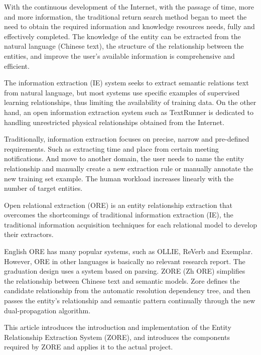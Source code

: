\begin{enabstract}
With the continuous development of the Internet, with the passage of time, more and more information, the traditional return search method began to meet the need to obtain the required information and knowledge resources needs, fully and effectively completed. The knowledge of the entity can be extracted from the natural language (Chinese text), the structure of the relationship between the entities, and improve the user's available information is comprehensive and efficient.

The information extraction (IE) system seeks to extract semantic relations text from natural language, but most systems use specific examples of supervised learning relationships, thus limiting the availability of training data. On the other hand, an open information extraction system such as TextRunner is dedicated to handling unrestricted physical relationships obtained from the Internet.

Traditionally, information extraction focuses on precise, narrow and pre-defined requirements. Such as extracting time and place from certain meeting notifications. And move to another domain, the user needs to name the entity relationship and manually create a new extraction rule or manually annotate the new training set example. The human workload increases linearly with the number of target entities.

Open relational extraction (ORE) is an entity relationship extraction that overcomes the shortcomings of traditional information extraction (IE), the traditional information acquisition techniques for each relational model to develop their extractors.

English ORE has many popular systems, such as OLLIE, ReVerb and Exemplar. However, ORE in other languages ​​is basically no relevant research report. The graduation design uses a system based on parsing. ZORE (Zh ORE) simplifies the relationship between Chinese text and semantic models. Zore defines the candidate relationship from the automatic resolution dependency tree, and then passes the entity's relationship and semantic pattern continually through the new dual-propagation algorithm.

This article introduces the introduction and implementation of the Entity Relationship Extraction System (ZORE), and introduces the components required by ZORE and applies it to the actual project.

\end{enabstract}

